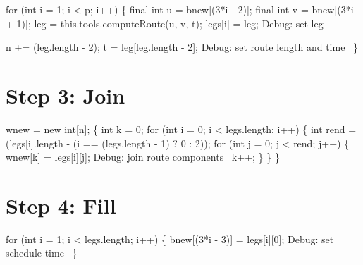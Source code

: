 \nwenddocs{}\endmoddef\nwstartdeflinemarkup{}\nwenddeflinemarkup
for (int i = 1; i < p; i++) \{
  final int u = bnew[(3*i - 2)];
  final int v = bnew[(3*i + 1)];
  leg = this.tools.computeRoute(u, v, t);
  legs[i] = leg;
  \LA{}Debug: set leg~{\nwtagstyle{}}\RA{}

  n += (leg.length - 2);
  t = leg[leg.length - 2];
  \LA{}Debug: set route length and time~{\nwtagstyle{}}\RA{}
\}
\nwendcode{}\nwdocspar

\section{Step 3: Join}

\nwenddocs{}\endmoddef\nwstartdeflinemarkup{}\nwenddeflinemarkup
wnew = new int[n];
\{
  int k = 0;
  for (int i = 0; i < legs.length; i++) \{
    int rend = (legs[i].length - (i == (legs.length - 1) ? 0 : 2));
    for (int j = 0; j < rend; j++) \{
      wnew[k] = legs[i][j];
      \LA{}Debug: join route components~{\nwtagstyle{}}\RA{}
      k++;
    \}
  \}
\}
\nwendcode{}\nwdocspar

\section{Step 4: Fill}

\nwenddocs{}\endmoddef\nwstartdeflinemarkup{}\nwenddeflinemarkup
for (int i = 1; i < legs.length; i++) \{
  bnew[(3*i - 3)] = legs[i][0];
  \LA{}Debug: set schedule time~{\nwtagstyle{}}\RA{}
\}

